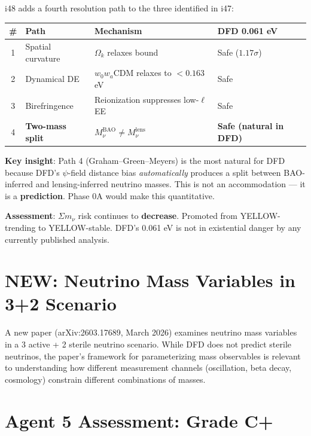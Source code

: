 \documentclass[11pt,a4paper]{article}
\newcommand{\NEW}{\textcolor{dfdblue}{\textbf{NEW}}}
\begin{document}
\begin{tcolorbox}[colback=green!5!white, colframe=green!60!black,
  title={$\Sigma m_\nu$ Landscape: Four Resolution Paths --- DFD Safe in All}]

i48 adds a fourth resolution path to the three identified in i47:

\begin{center}
\begin{tabular}{clp{5cm}l}
\toprule
\textbf{\#} & \textbf{Path} & \textbf{Mechanism} & \textbf{DFD 0.061 eV} \\
\midrule
1 & Spatial curvature & $\Omega_k$ relaxes bound & Safe ($1.17\sigma$) \\
2 & Dynamical DE & $w_0 w_a$CDM relaxes to $< 0.163$ eV & Safe \\
3 & Birefringence & Reionization suppresses low-$\ell$ EE & Safe \\
4 & \textbf{Two-mass split} & $M_\nu^{\text{BAO}} \neq M_\nu^{\text{lens}}$ & \textbf{Safe (natural in DFD)} \\
\bottomrule
\end{tabular}
\end{center}

\textbf{Key insight}: Path 4 (Graham--Green--Meyers) is the most natural for DFD because DFD's $\psi$-field distance bias \emph{automatically} produces a split between BAO-inferred and lensing-inferred neutrino masses. This is not an accommodation --- it is a \textbf{prediction}. Phase 0A would make this quantitative.

\textbf{Assessment}: $\Sigma m_\nu$ risk continues to \textbf{decrease}. Promoted from YELLOW-trending to YELLOW-stable. DFD's 0.061 eV is not in existential danger by any currently published analysis.
\end{tcolorbox}

\section{\NEW: Neutrino Mass Variables in 3+2 Scenario}

A new paper (arXiv:2603.17689, March 2026) examines neutrino mass variables in a 3 active + 2 sterile neutrino scenario. While DFD does not predict sterile neutrinos, the paper's framework for parameterizing mass observables is relevant to understanding how different measurement channels (oscillation, beta decay, cosmology) constrain different combinations of masses.

\section{Agent 5 Assessment: Grade C+}
\end{document}
